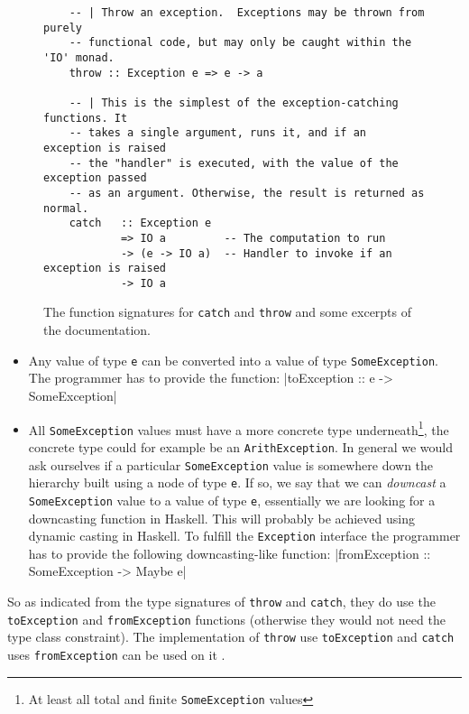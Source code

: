 \begin{figure}
\begin{mdframed}
  \begin{verbatim}
    -- | Throw an exception.  Exceptions may be thrown from purely
    -- functional code, but may only be caught within the 'IO' monad.
    throw :: Exception e => e -> a

    -- | This is the simplest of the exception-catching functions. It
    -- takes a single argument, runs it, and if an exception is raised
    -- the "handler" is executed, with the value of the exception passed
    -- as an argument. Otherwise, the result is returned as normal.
    catch   :: Exception e
            => IO a         -- The computation to run
            -> (e -> IO a)  -- Handler to invoke if an exception is raised
            -> IO a
  \end{verbatim}
  \caption{The function signatures for \texttt{catch} and
    \texttt{throw} and some excerpts of the documentation.}
  \label{fig:catch_and_throw}
\end{mdframed}
\end{figure}

\begin{itemize}
  \item
    Any value of type \texttt{e} can be converted
    into a value of type \texttt{SomeException}. The programmer has to
    provide the function:
    |toException :: e -> SomeException|
  \item
    All \texttt{SomeException} values must have a more concrete type
    underneath\footnote{At least all total and finite
      \texttt{SomeException} values}, the concrete type could for
    example be an \texttt{ArithException}. In general we
    would ask ourselves if a particular \texttt{SomeException} value is
    somewhere down the hierarchy built using a node of type \texttt{e}.
    If so, we say that we can \emph{downcast} a
    \texttt{SomeException} value to a value of type \texttt{e},
    essentially we are looking for a downcasting function in Haskell.
    This will probably be achieved using dynamic casting in Haskell.
    To fulfill the \texttt{Exception} interface 
    the programmer has to provide the following downcasting-like
    function:
    |fromException :: SomeException -> Maybe e|
\end{itemize}

So as indicated from the type signatures of \texttt{throw}
and \texttt{catch}, they do use the \texttt{toException} and
\texttt{fromException} functions (otherwise they would not need the
type class constraint). The implementation of \texttt{throw} use
\texttt{toException} and \texttt{catch} uses \texttt{fromException} can
be used on it \cite{github_catch_uses_SomeException}.

